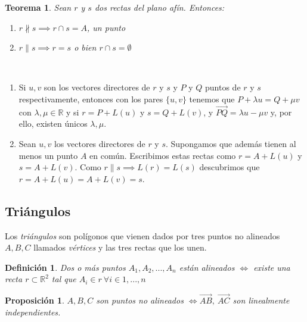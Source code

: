 \documentclass[11pt, a4paper]{article}
\makeatletter
\newif\IfInSansMode
\let\oldsf\sffamily
\renewcommand*{\sffamily}{\oldsf\mathversion{sans}\InSansModetrue}
\let\oldnorm\normalfont
\renewcommand*{\normalfont}{\oldnorm\InSansModefalse\mathversion{normal}}
\renewenvironment{proof}[1][\proofname] {\vspace{-15pt}\par\pushQED{\qed}\normalfont\topsep6\p@\@plus6\p@\relax\trivlist\item[\hskip\labelsep\it#1\@addpunct{.}]\ignorespaces}{\popQED\endtrivlist\@endpefalse}
\newcommand{\R}{\mathbb{R}}
\renewenvironment{proof}[1][\proofname] {\par\pushQED{\qed}\normalfont\topsep6\p@\@plus6\p@\relax\trivlist\item[\hskip\labelsep\itshape\sffamily#1\@addpunct{.}]\ignorespaces}{\popQED\endtrivlist\@endpefalse}
\theoremstyle{theorem-style}
\newtheorem{nth}{Teorema}[section]
\newtheorem{nprop}{Proposición}[section]
\theoremstyle{definition-style}
\newtheorem{ndef}{Definición}[section]
\theoremstyle{remark-style}
\theoremstyle{example-style}
\newenvironment{nlist}
{\begin{enumerate}
    \renewcommand\labelenumi{(\emph{\roman{enumi})}}}
  {\end{enumerate}}
\makeatother
\begin{document}
\begin{nth}
  Sean $r$ y $s$ dos rectas del plano afín. Entonces:
  \begin{nlist}
  \item $r \nparallel s\implies r \cap s = A$, un punto
  \item $r \parallel s \implies r = s$ o bien $r \cap s =  \emptyset$
  \end{nlist}
\end{nth}
  \begin{proof}\hfill\\
    \begin{nlist}
    \item Si $u,v$ son los vectores directores de $r$ y $s$ y $P$ y $Q$ puntos de $r$ y $s$ respectivamente, entonces con los pares $\{u,v\}$ tenemos que $P+\lambda u = Q + \mu v$ con $\lambda, \mu \in \R$
      y si $r = P +L(u)$ y $s=Q+L(v)$, y $\overrightarrow{PQ} = \lambda u - \mu v $ y, por ello, existen únicos $\lambda, \mu$.
    \item Sean $u,v$ los vectores directores de $r$ y $s$. Supongamos que además tienen al menos un punto $A$ en común. Escribimos estas rectas como $r = A +L(u)$ y $s=A+L(v)$. Como $r \parallel s \implies L(r)=L(s)$ descubrimos que $r = A +L(u)=A+L(v) = s$.
    \end{nlist}
  \end{proof}


\subsection{Triángulos}
Los \textit{triángulos} son polígonos que vienen dados por tres puntos no alineados $A, B, C$ llamados \textit{vértices} y las tres rectas que los unen.

\begin {ndef}
  Dos o más puntos $A_1, A_2, ... , A_n $ están alineados $\iff$ existe una recta $r \subset \mathbb{R}^2$ tal que $A_i \in r\ \forall i \in 1,...,n$
\end{ndef}


\begin{nprop}
  $A,B,C$ son puntos no alineados  $ \iff \overrightarrow{AB}, \ \overrightarrow{AC}$ son linealmente independientes.
\end{nprop}
\end{document}
